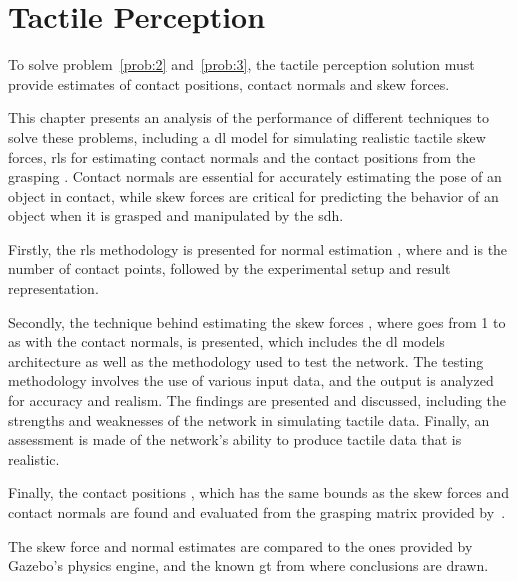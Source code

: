 \chapter{Tactile Perception}\label{ch:1-tactile-perception}

To solve problem~\ref{prob:2} and~\ref{prob:3}, the tactile perception solution must provide estimates of contact positions, contact normals and skew forces. \medskip

This chapter presents an analysis of the performance of different techniques to solve these problems, including a \gls{dl} model for simulating realistic tactile skew forces, \gls{rls} for estimating contact normals and the contact positions from the grasping . Contact normals are essential for accurately estimating the pose of an object in contact, while skew forces are critical for predicting the behavior of an object when it is grasped and manipulated by the \gls{sdh}. \medskip

Firstly, the \gls{rls} methodology is presented for normal estimation , where  and  is the number of contact points, followed by the experimental setup and result representation.\medskip

Secondly, the technique behind estimating the skew forces , where  goes from \num{1} to  as with the contact normals, is presented, which includes the \gls{dl} models architecture as well as the methodology used to test the network. The testing methodology involves the use of various input data, and the output is analyzed for accuracy and realism. The findings are presented and discussed, including the strengths and weaknesses of the network in simulating tactile data. Finally, an assessment is made of the network's ability to produce tactile data that is realistic. \medskip

Finally, the contact positions , which has the same bounds as the skew forces and contact normals are found and evaluated from the grasping matrix  provided by~\cite{simulation-of-the-syntouch-biotac-sensor}.\medskip

The skew force and normal estimates are compared to the ones provided by Gazebo's physics engine, and the known \gls{gt} from where conclusions are drawn. \medskip

